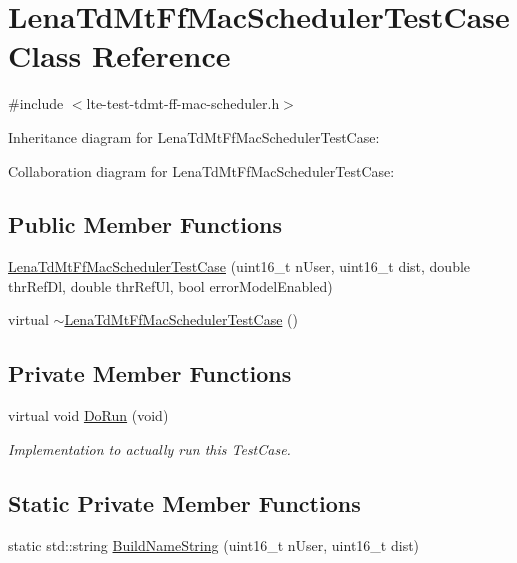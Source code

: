 \hypertarget{classLenaTdMtFfMacSchedulerTestCase}{}\section{Lena\+Td\+Mt\+Ff\+Mac\+Scheduler\+Test\+Case Class Reference}
\label{classLenaTdMtFfMacSchedulerTestCase}


{\ttfamily \#include $<$lte-\/test-\/tdmt-\/ff-\/mac-\/scheduler.\+h$>$}



Inheritance diagram for Lena\+Td\+Mt\+Ff\+Mac\+Scheduler\+Test\+Case\+:


Collaboration diagram for Lena\+Td\+Mt\+Ff\+Mac\+Scheduler\+Test\+Case\+:
\subsection*{Public Member Functions}
\begin{DoxyCompactItemize}
\item 
\hyperlink{classLenaTdMtFfMacSchedulerTestCase_a4d90399bd014e31cbc5c98f998ac0f59}{Lena\+Td\+Mt\+Ff\+Mac\+Scheduler\+Test\+Case} (uint16\+\_\+t n\+User, uint16\+\_\+t dist, double thr\+Ref\+Dl, double thr\+Ref\+Ul, bool error\+Model\+Enabled)
\item 
virtual \hyperlink{classLenaTdMtFfMacSchedulerTestCase_a260cddf0b6f0e7edf7a907aa8ec93b46}{$\sim$\+Lena\+Td\+Mt\+Ff\+Mac\+Scheduler\+Test\+Case} ()
\end{DoxyCompactItemize}
\subsection*{Private Member Functions}
\begin{DoxyCompactItemize}
\item 
virtual void \hyperlink{classLenaTdMtFfMacSchedulerTestCase_a58d638cd7e72948bb9956cd770eb053f}{Do\+Run} (void)
\begin{DoxyCompactList}\small\item\em Implementation to actually run this Test\+Case. \end{DoxyCompactList}\end{DoxyCompactItemize}
\subsection*{Static Private Member Functions}
\begin{DoxyCompactItemize}
\item 
static std\+::string \hyperlink{classLenaTdMtFfMacSchedulerTestCase_adadb77230b5189fd1ce235a8385409a2}{Build\+Name\+String} (uint16\+\_\+t n\+User, uint16\+\_\+t dist)
\end{DoxyCompactItemize}
